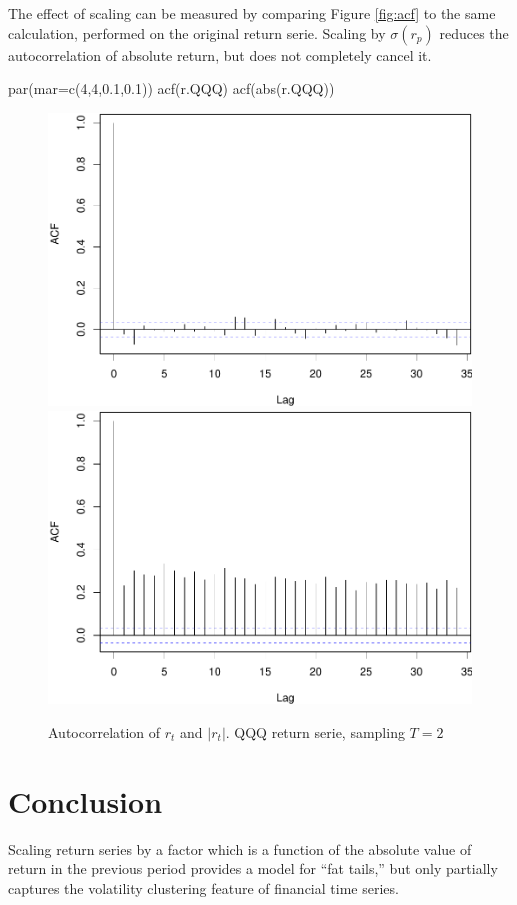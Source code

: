 \documentclass[
  11pt,
]{article}
\newenvironment{Shaded}{\begin{snugshade}}{\end{snugshade}}
\newcommand{\AttributeTok}[1]{\textcolor[rgb]{0.77,0.63,0.00}{#1}}
\newcommand{\DecValTok}[1]{\textcolor[rgb]{0.00,0.00,0.81}{#1}}
\newcommand{\FloatTok}[1]{\textcolor[rgb]{0.00,0.00,0.81}{#1}}
\newcommand{\FunctionTok}[1]{\textcolor[rgb]{0.00,0.00,0.00}{#1}}
\newcommand{\NormalTok}[1]{#1}
\begin{document}
The effect of scaling can be measured by comparing Figure \ref{fig:acf} to the same calculation, performed on the original return serie. Scaling by \(\sigma(r_p)\) reduces the autocorrelation of absolute return, but does not completely cancel it.

\begin{Shaded}
\begin{Highlighting}[]
\FunctionTok{par}\NormalTok{(}\AttributeTok{mar=}\FunctionTok{c}\NormalTok{(}\DecValTok{4}\NormalTok{,}\DecValTok{4}\NormalTok{,}\FloatTok{0.1}\NormalTok{,}\FloatTok{0.1}\NormalTok{))}
\FunctionTok{acf}\NormalTok{(r.QQQ)}
\FunctionTok{acf}\NormalTok{(}\FunctionTok{abs}\NormalTok{(r.QQQ))}
\end{Highlighting}
\end{Shaded}

\begin{figure}[H]
\includegraphics[width=0.5\linewidth]{figs/acf2-1} \includegraphics[width=0.5\linewidth]{figs/acf2-2} \caption{Autocorrelation of $r_t$ and $|r_t|$. QQQ return serie, sampling $T=2$}\label{fig:acf2}
\end{figure}

\hypertarget{conclusion}{%
\section{Conclusion}\label{conclusion}}

Scaling return series by a factor which is a function of the absolute value of return in the previous period provides a model for ``fat tails,'' but only partially captures the volatility clustering feature of financial time series.
\end{document}

